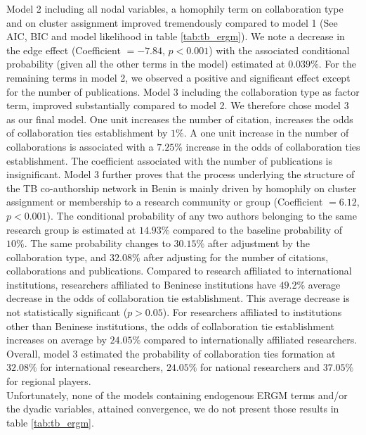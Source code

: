 Model 2 including all nodal variables, a homophily term on collaboration type and on cluster assignment improved tremendously compared to model 1 (See AIC, BIC and model likelihood in table \ref{tab:tb_ergm}). We note a decrease in the edge effect (Coefficient $=-7.84$, $p<0.001$) with the associated conditional probability (given all the other terms in the model) estimated at $0.039\%$. For the remaining terms in model 2, we observed a positive and significant effect except for the number of publications. Model 3 including the collaboration type as factor term, improved substantially compared to model 2. We therefore chose model 3 as our final model. One unit increases the number of citation, increases the odds of collaboration ties establishment by $1\%$. A one unit increase in the number of collaborations is associated with a $7.25\%$ increase in the odds of collaboration ties establishment. The coefficient associated with the number of publications is insignificant. Model 3 further proves that the process underlying the structure of the TB co-authorship network in Benin is mainly driven by homophily on cluster assignment or membership to a research community or group (Coefficient $=6.12$, $p<0.001$). The conditional probability of any two authors belonging to the same research group is estimated at $14.93\%$ compared to the baseline probability of $10\%$. The same probability changes to $30.15\%$ after adjustment by the collaboration type, and $32.08\%$ after adjusting for the number of citations, collaborations and publications. Compared to research affiliated to international institutions, researchers affiliated to Beninese institutions have $49.2\%$ average decrease in the odds of collaboration tie establishment. This average decrease is not statistically significant ($p>0.05$). For researchers affiliated to institutions other than Beninese institutions, the odds of collaboration tie establishment increases on average by $24.05\%$ compared to internationally affiliated researchers. Overall, model 3 estimated the probability of collaboration ties formation at $32.08\%$ for international researchers, $24.05\%$ for national researchers and $37.05\%$ for regional players. \\
Unfortunately, none of the models containing endogenous ERGM terms and/or the dyadic variables, attained convergence, we do not present those results in table \ref{tab:tb_ergm}.

